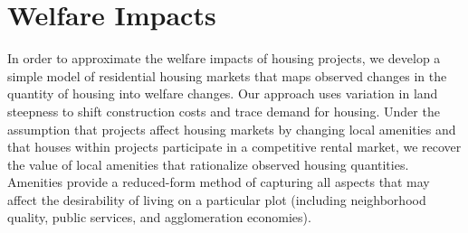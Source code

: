 \documentclass[12pt]{article}
\begin{document}




\section{Welfare Impacts}\label{section:theory}





In order to approximate the welfare impacts of housing projects, we develop a simple model of residential housing markets that maps observed changes in the quantity of housing into welfare changes.  Our approach uses variation in land steepness to shift construction costs and trace demand for housing.  Under the assumption that projects affect housing markets by changing local amenities and that houses within projects participate in a competitive rental market, we recover the value of local amenities that rationalize observed housing quantities.  Amenities provide a reduced-form method of capturing all aspects that may affect the desirability of living on a particular plot (including neighborhood quality, public services, and agglomeration economies).


\end{document}
